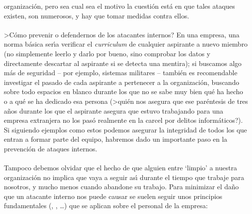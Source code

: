 organizaci\'on, pero sea cual sea el motivo la cuesti\'on est\'a en que tales
ataques existen, son numerosos, y hay que tomar medidas contra ellos.\\
\\>C\'omo prevenir o defendernos de los atacantes internos? En una
empresa, una norma b\'asica ser\'{\i}a verificar el {\it curriculum} de
cualquier aspirante a nuevo miembro (no simplemente leerlo y darlo por bueno,
sino comprobar los datos y directamente descartar al aspirante si se detecta
una mentira); si buscamos algo m\'as de seguridad -- por ejemplo, sistemas
militares -- tambi\'en es recomendable investigar el pasado de cada aspirante
a pertenecer a la organizaci\'on, buscando sobre todo espacios en blanco durante
los que no se sabe muy bien qu\'e ha hecho o a qu\'e se ha dedicado esa
persona (>qui\'en nos asegura que ese par\'entesis de tres a\~nos durante los
que el aspirante asegura que estuvo trabajando para una empresa extranjera no
los pas\'o realmente en la carcel por delitos inform\'aticos?). Si siguiendo
ejemplos como estos podemos asegurar la integridad de todos los que entran
a formar parte del equipo, habremos dado un importante paso en la prevenci\'on
de ataques internos.\\
\\Tampoco debemos olvidar que el hecho de que alguien entre `limpio' a nuestra
organizaci\'on no implica que vaya a seguir as\'{\i} durante el tiempo que
trabaje para nosotros, y mucho menos cuando abandone su trabajo. Para minimizar
el da\~no que un atacante interno nos puede causar se suelen seguir unos
principios fundamentales (\cite{kn:smi92}, \cite{kn:spa96}, 
\cite{kn:pla83}\ldots) que se aplican sobre el personal de la empresa:
